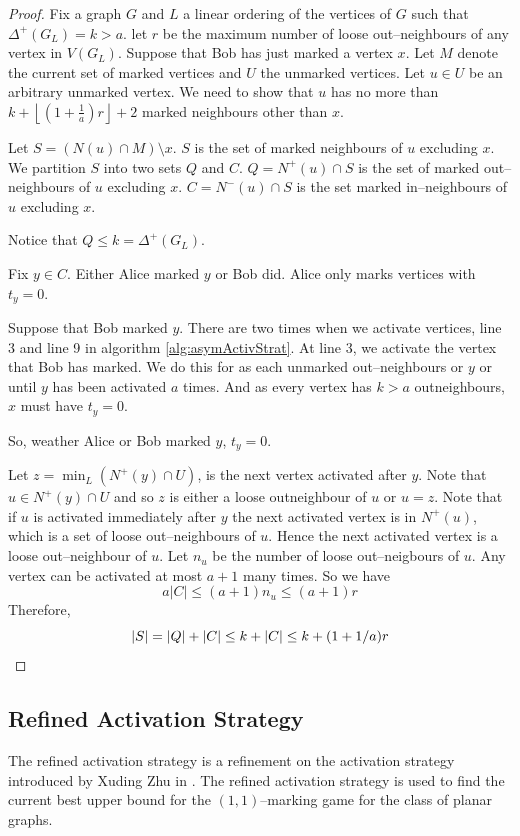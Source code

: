 \begin{proof}
%
Fix a graph $G$ and $L$ a linear ordering of the vertices of $G$ such that $\Delta^+(G_L)=k>a$. let $r$ be the maximum number of loose out--neighbours of any vertex in $V(G_L)$. Suppose that Bob has just marked a vertex $x$. Let $M$ denote the current set of marked vertices and $U$ the unmarked vertices. Let $u\in U$ be an arbitrary unmarked vertex. We need to show that $u$ has no more than  $k+\left\lfloor \left(1+\frac{1}{a}\right)r \right\rfloor +2$ marked neighbours other than $x$. 

Let $S=(N(u)\cap M) \setminus {x}$. $S$ is the set of marked neighbours of $u$ excluding $x$. We partition $S$ into two sets $Q$ and $C$. $Q=N^+(u)\cap S$ is the set of marked out--neighbours of $u$ excluding $x$. $C=N^-(u)\cap S$ is  the set marked in--neighbours of $u$ excluding $x$.

Notice that $Q\leq k = \Delta^+(G_L)$. 

Fix $y\in C$. Either Alice marked $y$ or Bob did. Alice only marks vertices with $t_y=0$. 

Suppose that Bob marked $y$.
There are two times when we activate vertices, line 3 and line 9 in algorithm \ref{alg:asymActivStrat}. At line 3, we activate the vertex that Bob has marked. We do this for as each unmarked out--neighbours or $y$ or until $y$ has been activated $a$ times. And as every vertex has $k>a$ outneighbours, $x$ must have $t_y=0$.

So, weather Alice or Bob marked $y$, $t_y=0$.

Let $z = \min_{L}(N^+(y)\cap U)$, is the next vertex activated after $y$. Note that $u\in N^+(y)\cap U$ and so $z$ is either a loose outneighbour of $u$ or $u=z$. Note that if $u$ is activated immediately after $y$ the next activated vertex is in $N^+(u)$, which is a set of loose out--neighbours of $u$. Hence the next activated vertex is a loose out--neighbour of $u$. Let $n_u$ be the number of loose out--neigbours of $u$. Any vertex can be activated at most $a+1$ many times. So we have 
\[a|C|\leq (a+1)n_u\leq (a+1)r\]
Therefore,
\[|S|=|Q|+|C|\leq k +|C| \leq k + (1+1/a)r \qedhere\] 
\end{proof}

    
    




\subsection{Refined Activation Strategy}\label{sec:refActStrat}
The refined activation strategy is a refinement on the activation strategy introduced by Xuding Zhu in \cite{Zhu2008}. The refined activation strategy is used to find the current best upper bound for the $(1,1)$--marking game for the class of planar graphs. 

